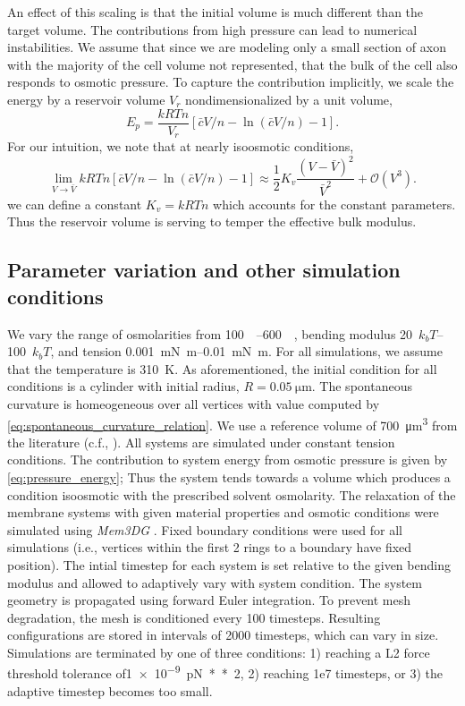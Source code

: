 \documentclass[11pt]{article}
\begin{document}
An effect of this scaling is that the initial volume is much different than the target volume. 
The contributions from high pressure can lead to numerical instabilities. 
We assume that since we are modeling only a small section of axon with the majority of the cell volume not represented, that the bulk of the cell also responds to osmotic pressure.
To capture the contribution implicitly, we scale the energy by a reservoir volume \(V_r\) nondimensionalized by a unit volume,
\begin{equation}
    E_p =\frac{kRTn}{V_r}[\bar{c}V/n - \ln(\bar{c}V/n) -1].
    \label{eq:pressure_energy}
\end{equation}
For our intuition, we note that at nearly isoosmotic conditions,
\begin{equation}
    \lim_{V\to\bar{V}} kRTn[\bar{c}V/n - \ln(\bar{c}V/n) -1] \approx \frac{1}{2}K_v \frac{(V - \bar{V})^2}{\bar{V}^2} + \mathcal{O}(V^3).
\end{equation}
we can define a constant \(K_v = kRTn\) which accounts for the constant parameters.
Thus the reservoir volume is serving to temper the effective bulk modulus.

\subsection{Parameter variation and other simulation conditions}

We vary the range of osmolarities from \SIrange[]{100}{600}{\milli\osm}, bending modulus \SIrange[]{20}{100}{\(k_bT\)}, and tension \SIrange[]{0.001}{0.01}{\milli\newton\meter}.
For all simulations, we assume that the temperature is \SI{310}{\kelvin}.
As aforementioned, the initial condition for all conditions is a cylinder with initial radius, \(R = \SI{0.05}{\micro\meter}\).
The spontaneous curvature is homeogeneous over all vertices with value computed by \cref{eq:spontaneous_curvature_relation}.
We use a reference volume of \SI{700}{\micro\meter\cubed} from the literature (c.f., \textcite{LarsenEtAl2021}).
All systems are simulated under constant tension conditions.
The contribution to system energy from osmotic pressure is given by \cref{eq:pressure_energy};
Thus the system tends towards a volume which produces a condition isoosmotic with the prescribed solvent osmolarity.
The relaxation of the membrane systems with given material properties and osmotic conditions were simulated using \textit{Mem3DG} \cite{ZhuEtAl2022}.
Fixed boundary conditions were used for all simulations (i.e., vertices within the first 2 rings to a boundary have fixed position).
The intial timestep for each system is set relative to the given bending modulus and allowed to adaptively vary with system condition.
The system geometry is propagated using forward Euler integration.
To prevent mesh degradation, the mesh is conditioned every 100 timesteps.
Resulting configurations are stored in intervals of 2000 timesteps, which can vary in size.
Simulations are terminated by one of three conditions: 1) reaching a L2 force threshold tolerance of\SI{1e-9}{\pico\newton**2}, 2) reaching \si{1e7} timesteps, or 3) the adaptive timestep becomes too small.
\end{document}
